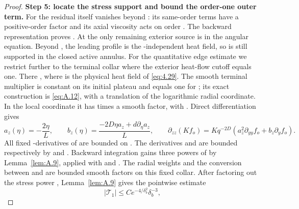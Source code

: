 \begin{proof}
\textbf{Step 5: locate the stress support and bound the order-one outer term.}
For  the residual itself vanishes beyond : its same-order terms have a
positive-order factor and its axial viscosity acts on order . The backward representation proves
. At  the only remaining exterior source is
 in the angular equation. Beyond , the leading profile
is the -independent heat field, so  is still supported in the closed active
annulus. For the quantitative edge estimate we restrict further to the terminal collar where the exterior heat-flow cutoff
equals one. There , where
 is the physical heat field of \eqref{eq:4.29}.
The smooth terminal multiplier  is constant on its initial plateau and equals one for
; its exact construction is \eqref{eq:A.12}, with a translation of the logarithmic radial
coordinate. In the local coordinate  it has
 times a smooth factor, with
. Direct differentiation gives
\[
a_z(\eta)=-\frac{2\eta}{L},
\qquad
b_z(\eta)=\frac{-2D\eta a_z+d\partial_\eta a_z}{L},
\qquad
\partial_{zz}(Kf_o)=Kq^{-2D}\left(a_z^2\partial_{yy}f_o+b_z\partial_yf_o\right).
\]
All fixed -derivatives of  are bounded on
. The derivatives  and
 are bounded respectively by
 and
. Backward integration gains three powers of
 by Lemma~\ref{lem:A.9}, applied with
 and . The radial weights and the conversion between
 and  are bounded smooth factors on this fixed collar. After factoring out
the stress power , Lemma~\ref{lem:A.9} gives the pointwise estimate
\begin{equation}\label{eq:5.22}
|\mathcal T_1|\leq Ce^{-4/\delta_b^2}\delta_b^{-3},

\end{equation}
\end{proof}
